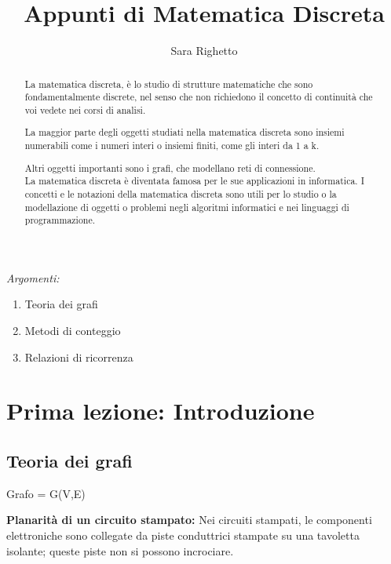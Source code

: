 \documentclass[12pt,a4paper]{article}
\begin{document}
    \author{Sara Righetto}
    \title{Appunti di Matematica Discreta}

    \maketitle

    \newpage
    \tableofcontents

    \newpage

    \begin{abstract}
        La matematica discreta, è lo studio di strutture matematiche che sono fondamentalmente discrete, nel senso che non
    richiedono il concetto di continuità che voi vedete nei corsi di analisi. \par
    La maggior parte degli oggetti studiati nella matematica discreta sono insiemi numerabili come i numeri interi o
    insiemi finiti, come gli interi da 1 a k. \par
    Altri oggetti importanti sono i grafi, che modellano reti di connessione. \\

        La matematica discreta è diventata famosa per le sue applicazioni in informatica. I concetti e le notazioni della matematica discreta sono utili per lo studio o la modellazione di oggetti o problemi negli algoritmi informatici e nei linguaggi di programmazione.
    \end{abstract}

\begin{center}
    \textit{Argomenti:}
    \begin{enumerate}
        \item Teoria dei grafi 
        \item Metodi di conteggio
        \item Relazioni di ricorrenza
    \end{enumerate}
\end{center}

    \newpage


    \section{Prima lezione: Introduzione}

    \subsection{Teoria dei grafi}
        Grafo = G(V,E) \par
        \textbf{Planarità di un circuito stampato:} 
Nei circuiti stampati, le componenti elettroniche sono collegate da piste conduttrici stampate su una tavoletta
isolante; queste piste non si possono incrociare.\\
\end{document}
